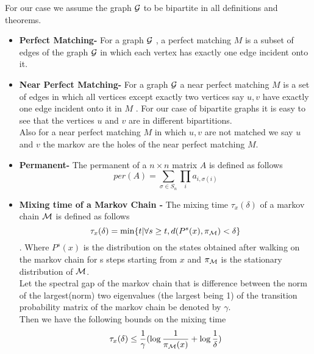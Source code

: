 For our case we assume the graph $\mathcal{G}$ to be bipartite in all definitions and theorems.
\begin{itemize}
	
	\item \begin{flushleft}
		\textbf{Perfect Matching-} For a graph $\mathcal{G}$ , a perfect matching $M$ is a  subset of edges of the graph $\mathcal{G}$  in which each vertex has exactly one edge incident onto it. 
	\end{flushleft}
	
	\item \begin{flushleft}
		\textbf{Near Perfect Matching-} For a graph $\mathcal{G}$ a near perfect matching $M$ is a set of edges in which all vertices except exactly two vertices say $u,v$ have exactly one edge incident onto it in $M$ . For our case of bipartite graphs it is easy to see that the vertices $u$ and $v$ are in different bipartitions.\\
		
		Also for a near perfect  matching $M$ in which $u,v$ are not matched we say $u$ and $v$ the markov are the holes of the near perfect  matching $M$.
	\end{flushleft}
	
	\item \begin{flushleft}
		\textbf{Permanent-} The permanent of a $n \times n$ matrix $A$ is defined as follows $$per(A)= \sum_{\sigma \in S_n}\prod_{i}a_{i,\sigma(i)}$$
	\end{flushleft}
	\item \begin{flushleft}
		\textbf{Mixing time of a Markov Chain -}
		The mixing time $\tau_x(\delta)$ of a markov chain $\mathcal{M}$  is defined as follows
		$$\tau_x(\delta)=\min\{t | \forall s\geq t,
		d(P^s(x),\pi_{\mathcal{M}})<\delta \}$$. Where $P^s(x)$ is the distribution on the states obtained after walking on the markov chain for s steps starting from $x$ and $\pi_{\mathcal{M}}$ is the stationary distribution of $\mathcal{M}$.\\
		Let the spectral gap of the markov chain that is difference between the norm of the largest(norm) two eigenvalues (the largest being 1) of the transition probability matrix of the markov chain be denoted by $\gamma$.\\
		Then we have the following bounds on the mixing time 
		$$\tau_x(\delta)\leq \frac{1}{\gamma}(\log{\frac{1}{\pi_{\mathcal{M}}(x)}}+ \log{\frac{1}{\delta}})$$
	\end{flushleft}
	
\end{itemize}

